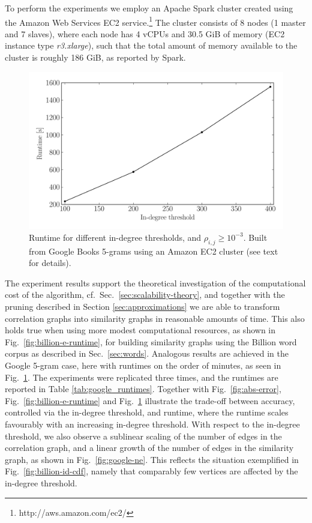 \documentclass{kais}
\newcommand{\rn}[1]{\rho_{#1}}
\begin{document}
To perform the experiments we employ an Apache Spark cluster created using the Amazon
Web Services EC2 service.\footnote{http://aws.amazon.com/ec2/}
The cluster consists of 8 nodes (1 master and 7 slaves), where each node has 4 vCPUs and
30.5 GiB of memory (EC2 instance type \emph{r3.xlarge}), such that the total amount of memory available to the cluster
is roughly 186 GiB, as reported by Spark.

\begin{figure}
\centerline{\includegraphics[width=0.75\columnwidth]{figures/eng-all-edge-low-e3-vtx-low-e8-high-e1-100-400-idg-nt.pdf}}
\caption{Runtime for different in-degree 
thresholds, and $\rn{i,j} \geq 10^{-3}$. Built from Google Books 5-grams using an Amazon
EC2 cluster (see text for details).}
\label{fig:google-e-runtime}
\end{figure}

The experiment results support the theoretical investigation of the computational
cost of the algorithm, cf.~Sec.~\ref{sec:scalability-theory}, and together with the pruning
described in Section \ref{sec:approximations} we are able to transform correlation graphs into similarity
graphs in reasonable amounts of time. This also holds true when using more modest computational resources,
as shown in Fig.\ \ref{fig:billion-e-runtime}, for building similarity graphs using the Billion word corpus as described
in Sec.\ \ref{sec:words}. Analogous results are achieved in the Google 5-gram case, here with runtimes on the order of minutes,
as seen in Fig.\ \ref{fig:google-e-runtime}. The experiments were replicated three times, and
the runtimes are reported in Table \ref{tab:google_runtimes}.
Together with Fig.\ \ref{fig:abs-error}, Fig.\ \ref{fig:billion-e-runtime} and Fig.\ \ref{fig:google-e-runtime} illustrate the trade-off between accuracy, controlled
via the in-degree threshold, and runtime, where the runtime scales favourably with an increasing in-degree threshold.
With respect to the in-degree threshold, we also observe a sublinear scaling of the number of edges in the correlation
graph, and a linear growth of the number of  edges in the similarity graph,  as shown in Fig.\ \ref{fig:google-ne}. This reflects the situation exemplified in Fig.\ \ref{fig:billion-id-cdf}, namely that comparably few vertices are affected by the in-degree threshold.
\end{document}
